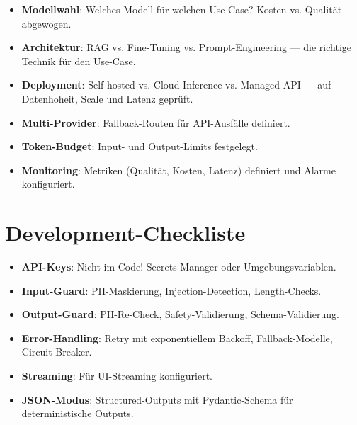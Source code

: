 \begin{itemize}[leftmargin=*]
     \item \textbf{Modellwahl}\hspace{0pt}: Welches Modell für welchen Use-Case? Kosten vs. Qualität abgewogen.
     \item \textbf{Architektur}\hspace{0pt}: RAG vs. Fine-Tuning vs. Prompt-Engineering --- die richtige Technik für den Use-Case.
     \item \textbf{Deployment}\hspace{0pt}: Self-hosted vs. Cloud-Inference vs. Managed-API --- auf Datenhoheit, Scale und Latenz geprüft.
     \item \textbf{Multi-Provider}\hspace{0pt}: Fallback-Routen für API-Ausfälle definiert.
     \item \textbf{Token-Budget}\hspace{0pt}: Input- und Output-Limits festgelegt.
     \item \textbf{Monitoring}\hspace{0pt}: Metriken (Qualität, Kosten, Latenz) definiert und Alarme konfiguriert.
\end{itemize}

\section{Development-Checkliste}

\begin{itemize}[leftmargin=*]
     \item \textbf{API-Keys}\hspace{0pt}: Nicht im Code! Secrets-Manager oder Umgebungsvariablen.
     \item \textbf{Input-Guard}\hspace{0pt}: PII-Maskierung, Injection-Detection, Length-Checks.
     \item \textbf{Output-Guard}\hspace{0pt}: PII-Re-Check, Safety-Validierung, Schema-Validierung.
     \item \textbf{Error-Handling}\hspace{0pt}: Retry mit exponentiellem Backoff, Fallback-Modelle, Circuit-Breaker.
     \item \textbf{Streaming}\hspace{0pt}: Für UI-Streaming konfiguriert.
     \item \textbf{JSON-Modus}\hspace{0pt}: Structured-Outputs mit Pydantic-Schema für deterministische Outputs.
\end{itemize}

